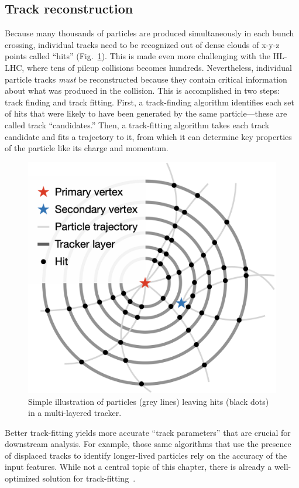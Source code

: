 \subsection{Track reconstruction}
Because many thousands of particles are produced simultaneously in each bunch crossing, individual tracks need to be recognized out of dense clouds of x-y-z points called ``hits'' (Fig.~\ref{fig:tracking_cartoon}).
This is made even more challenging with the HL-LHC, where tens of pileup collisions becomes hundreds.
Nevertheless, individual particle tracks \textit{must} be reconstructed because they contain critical information about what was produced in the collision.
This is accomplished in two steps: track finding and track fitting.
First, a track-finding algorithm identifies each set of hits that were likely to have been generated by the same particle---these are called track ``candidates.''
Then, a track-fitting algorithm takes each track candidate and fits a trajectory to it, from which it can determine key properties of the particle like its charge and momentum.

\begin{figure}[!htb]
    \centering
    \includegraphics[width=0.45\linewidth]{fig/lst/tracking_cartoon.png}
    \caption{
        Simple illustration of particles (grey lines) leaving hits (black dots) in a multi-layered tracker. 
    }
    \label{fig:tracking_cartoon}
\end{figure}

Better track-fitting yields more accurate ``track parameters'' that are crucial for downstream analysis. 
For example, those same algorithms that use the presence of displaced tracks to identify longer-lived particles rely on the accuracy of the input features. 
While not a central topic of this chapter, there is already a well-optimized solution for track-fitting~\cite{cerati2023generalizing}.

